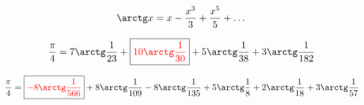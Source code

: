 \documentclass{article}
\begin{document}
$$\arctg x = x - \frac{x^3}{3} + \frac{x^5}{5} + \dots$$

$$\frac{\pi}{4} = 7\arctg\frac{1}{23} + \boxed{\color{red} 10\arctg\frac{1}{30}} + 5\arctg\frac{1}{38} + 3\arctg\frac{1}{182}$$

$$\frac{\pi}{4} = \boxed{\color{red} -8\arctg\frac{1}{566}} + 8\arctg\frac{1}{109} - 8\arctg\frac{1}{135} + 5\arctg\frac{1}{8} + 2\arctg\frac{1}{18} + 3\arctg\frac{1}{57}$$
\end{document}
